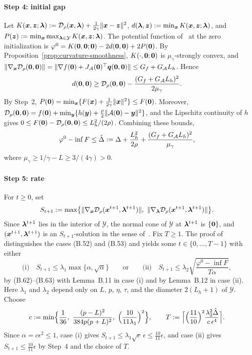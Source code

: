 \paragraph{Step 4: initial gap}
Let \(K(\bm{x},\bm{z};\bm{\lambda}):=\mathcal{D}_\rho(\bm{x},\bm{\lambda})+\frac1{2\gamma}\|\bm{x}-\bm{z}\|^2\),
\(d(\bm{\lambda},\bm{z}):=\min_{\bm{x}}K(\bm{x},\bm{z};\bm{\lambda})\), and
\(P(\bm{z}):=\min_{\bm{x}}\max_{\bm{\lambda}\in\mathcal Y}K(\bm{x},\bm{z};\bm{\lambda})\). The
potential function of~\cite[(4.1)]{zhang2020smoothed} at the zero
initialization is \(\varphi^0=K(\bm{0},\bm{0};\bm{0})-2d(\bm{0},\bm{0})+2P(\bm{0})\).
By Proposition~\ref{prop:curvature-smoothness}, \(K(\cdot,\bm{0};\bm{0})\) is
\(\mu_\gamma\)-strongly convex, and
\(\|\nabla_{\bm{x}}\mathcal{D}_\rho(\bm{0},\bm{0})\|
=\|\nabla f(\bm{0})+J_{\mathcal{A}}(\bm{0})^\top\bm{q}(\bm{0},\bm{0})\|\le G_f+G_{\mathcal{A}}L_h\).
Hence
\[
d(\bm{0},\bm{0})\ge\mathcal{D}_\rho(\bm{0},\bm{0})-\frac{(G_f+G_{\mathcal{A}}L_h)^2}{2\mu_\gamma}.
\]
By Step~2, \(P(\bm{0})=\min_{\bm{x}}\{F(\bm{x})+\frac1{2\gamma}\|\bm{x}\|^2\}\le F(\bm{0})\).
Moreover,
\(\mathcal{D}_\rho(\bm{0},\bm{0})=f(\bm{0})+\min_{\bm{y}}\{h(\bm{y})+\frac\rho2\|\mathcal{A}(\bm{0})-\bm{y}\|^2\}\),
and the Lipschitz continuity of \(h\) gives
\(0\le F(\bm{0})-\mathcal{D}_\rho(\bm{0},\bm{0})\le L_h^2/(2\rho)\). Combining these
bounds,
\[
\varphi^0-\inf F\le\hat\Delta
:=\Delta+\frac{L_h^2}{2\rho}+\frac{(G_f+G_{\mathcal{A}}L_h)^2}{\mu_\gamma},
\]
where \(\mu_\gamma\ge1/\gamma-L\ge3/(4\gamma)>0\).

\paragraph{Step 5: rate}
For \(t\ge0\), set
\[
S_{t+1}:=\max\bigl\{\|\nabla_{\bm{x}}\mathcal{D}_\rho(\bm{x}^{t+1},\bm{\lambda}^{t+1})\|,\
\|\nabla_{\bm{\lambda}}\mathcal{D}_\rho(\bm{x}^{t+1},\bm{\lambda}^{t+1})\|\bigr\}.
\]
Since \(\bm{\lambda}^{t+1}\) lies in the interior of \(\mathcal Y\), the normal
cone of \(\mathcal Y\) at \(\bm{\lambda}^{t+1}\) is \(\{\bm{0}\}\), and
\((\bm{x}^{t+1},\bm{\lambda}^{t+1})\) is an \(S_{t+1}\)-solution in the sense
of~\cite[Definition~3.1]{zhang2020smoothed}. Fix \(T\ge1\). The proof
of~\cite[Theorem~3.4]{zhang2020smoothed} distinguishes the cases (B.52) and
(B.53) and yields some \(t\in\{0,\dots,T-1\}\) with either
\[
\text{(i)}\quad S_{t+1}\le\lambda_1\max\{\alpha,\sqrt\alpha\}
\qquad\text{or}\qquad
\text{(ii)}\quad S_{t+1}\le\lambda_2\sqrt{\frac{\varphi^0-\inf F}{T\alpha}},
\]
by (B.62)--(B.63) with Lemma~B.11 in case (i) and by Lemma~B.12 in case (ii).
Here \(\lambda_1\) and \(\lambda_2\) depend only on \(L\), \(p\), \(\eta\),
\(\tau\), and the diameter \(2(L_h+1)\) of \(\mathcal Y\). Choose
\[
c:=\min\Bigl\{\frac1{36},\ \frac{(p-L)^2}{384p(p+L)^2},\
\Bigl(\frac{10}{11\lambda_1}\Bigr)^2\Bigr\},
\qquad
T:=\Bigl\lceil\Bigl(\frac{11}{10}\Bigr)^2\frac{\lambda_2^2\hat\Delta}{c\,\epsilon^4}\Bigr\rceil.
\]
Since \(\alpha=c\epsilon^2\le1\), case (i) gives
\(S_{t+1}\le\lambda_1\sqrt c\,\epsilon\le\frac{10}{11}\epsilon\), and case
(ii) gives \(S_{t+1}\le\frac{10}{11}\epsilon\) by Step~4 and the choice of
\(T\).

